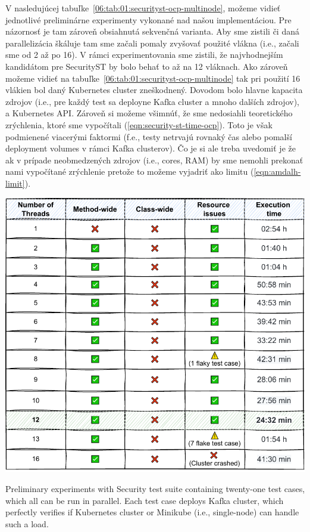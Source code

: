 V nasledujúcej tabuľke~\ref{06:tab:01:securityst-ocp-multinode}, možeme vidieť jednotlivé preliminárne experimenty vykonané
nad našou implementáciou. Pre názornosť je tam zároveň obsiahnutá sekvenčná varianta. Aby sme zistili či daná parallelizácia
škáluje tam sme začali pomaly zvyšovať použité vlákna (i.e., začali sme od 2 až po 16). V rámci experimentovania sme zistili,
že najvhodnejším kandidátom pre SecurityST by bolo behať to až na 12 vláknach. Ako zároveň možeme vidieť na
tabuľke~\ref{06:tab:01:securityst-ocp-multinode} tak pri použití 16 vlákien bol daný Kubernetes cluster zneškodnený.
Dovodom bolo hlavne kapacita zdrojov (i.e., pre každý test sa deployne Kafka cluster a mnoho dalších zdrojov), a Kubernetes API.
Zároveň si možeme všimnúť, že sme nedosiahli teoretického zrýchlenia, ktoré sme vypočítali (\eqref{eqn:security-st-time-ocp}).
Toto je však podmienené viacerými faktormi (f.e., testy netrvajú rovnaký čas alebo pomalší deployment volumes v rámci Kafka clusterov).
Čo je si ale treba uvedomiť je že ak v prípade neobmedzených zdrojov (i.e., cores, RAM) by sme nemohli prekonať nami vypočítané zrýchlenie
pretože to možeme vyjadriť ako limitu (\eqref{eqn:amdalh-limit}).
\begin{table}[ht!]
    \centering
    \includegraphics[scale=0.8]{obrazky-figures/08-experiments/06-exp-final-smoke}
    \caption{Preliminary experiments with Security test suite containing twenty-one test cases, which all can be run in parallel.
    Each test case deploys Kafka cluster, which perfectly verifies if Kubernetes cluster or Minikube (i.e., single-node) can handle such a load.}
    \label{06:tab:01:securityst-ocp-multinode}
\end{table}

